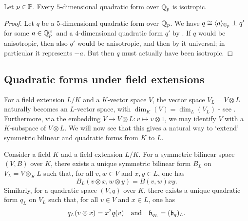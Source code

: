 \documentclass[12pt, leqno, british]{amsart}
\begin{document}
\begin{cor}\label{C:classify-5-dimensional-qqp}
Let $p \in \mathbb P$.
Every $5$-dimensional quadratic form over $\mathbb Q_p$ is isotropic.
\end{cor}
\begin{proof}
Let $q$ be a $5$-dimensional quadratic form over $\mathbb Q_p$.
We have $q \cong \langle a \rangle_{\mathbb Q_p} \perp q'$ for some $a \in \mathbb Q_p^\times$ and a $4$-dimensional quadratic form $q'$ by .
If $q$ would be anisotropic, then also $q'$ would be anisotropic, and then by  it universal; in particular it represents $-a$.
But then $q$ must actually have been isotropic.
\end{proof}

\subsection{Quadratic forms under field extensions}
For a field extension $L/K$ and a $K$-vector space $V$, the vector space $V_L = V \otimes L$ naturally becomes an $L$-vector space, with $\dim_K(V) = \dim_L(V_L)$ - see .
Furthermore, via the embedding $V \to V \otimes L : v \mapsto v \otimes 1$, we may identify $V$ with a $K$-subspace of $V \otimes L$.
We will now see that this gives a natural way to `extend' symmetric bilinear and quadratic forms from $K$ to $L$.
\begin{prop}\label{P:scalar-extension}
Consider a field $K$ and a field extension $L/K$.
For a symmetric bilinear space $(V, B)$ over $K$, there exists a unique symmetric bilinear form $B_L$ on $V_L = V \otimes_K L$ such that, for all $v, w \in V$ and $x, y \in L$, one has
$$ B_L(v \otimes x, w \otimes y) = B(v, w)xy.$$
Similarly, for a quadratic space $(V, q)$ over $K$, there exists a unique quadratic form $q_L$ on $V_L$ such that, for all $v \in V$ and $x \in L$, one has
$$q_L(v \otimes x) = x^2q(v) \quad \text{and} \quad \mathfrak{b}_{q_L} = (\mathfrak{b}_q)_L.$$
\end{prop}
\end{document}
